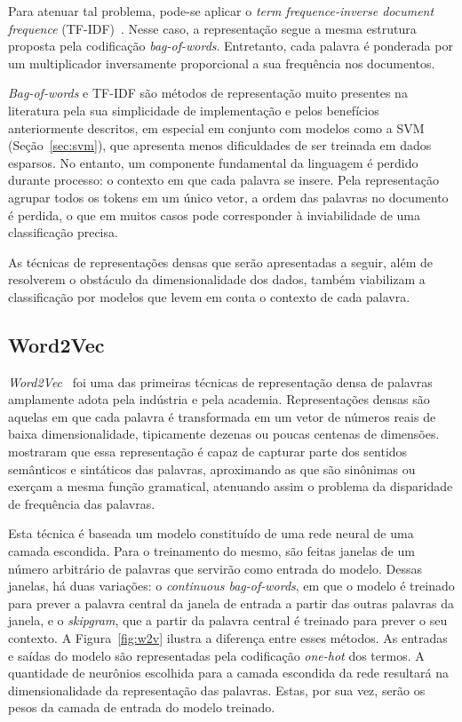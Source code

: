 Para atenuar tal problema, pode-se aplicar o \textit{term frequence-inverse
document frequence} (TF-IDF)~\cite{salton88}.
Nesse caso, a representação segue a mesma estrutura proposta pela codificação
\textit{bag-of-words}.
Entretanto, cada palavra é ponderada por um multiplicador inversamente
proporcional a sua frequência nos documentos.


\textit{Bag-of-words} e TF-IDF são métodos de representação muito presentes na
literatura pela sua simplicidade de implementação e pelos benefícios
anteriormente descritos, em especial em conjunto com modelos como a
SVM (Seção~\ref{sec:svm}), que apresenta menos dificuldades de ser treinada em
dados esparsos.
No entanto, um componente fundamental da linguagem é perdido durante processo: o
contexto em que cada palavra se insere.
Pela representação agrupar todos os tokens em um único vetor, a ordem das
palavras no documento é perdida, o que em muitos casos pode corresponder à
inviabilidade de uma classificação precisa.


As técnicas de representações densas que serão apresentadas a seguir, além de
resolverem o obstáculo da dimensionalidade dos dados, também viabilizam a
classificação por modelos que levem em conta o contexto de cada palavra.

\subsection{Word2Vec} \label{sec:w2v}

\textit{Word2Vec}~\cite{mikolov13} foi uma das primeiras técnicas de
representação densa de palavras amplamente adota pela indústria e pela academia.
Representações densas são aquelas em que cada palavra é transformada em um vetor
de números reais de baixa dimensionalidade, tipicamente dezenas ou poucas
centenas de dimensões.
\citet{mikolov13} mostraram que essa representação é capaz de capturar parte dos
sentidos semânticos e sintáticos das palavras, aproximando as que são sinônimas
ou exerçam a mesma função gramatical, atenuando assim o problema da disparidade
de frequência das palavras.

Esta técnica é baseada um modelo constituído de uma rede neural de uma camada escondida.
Para o treinamento do mesmo, são feitas janelas de um número arbitrário de
palavras que servirão como entrada do modelo.
Dessas janelas, há duas variações: o \textit{continuous bag-of-words}, em que
o modelo é treinado para prever a palavra central da janela de entrada a partir
das outras palavras da janela, e o \textit{skipgram}, que a partir da palavra
central é treinado para prever o seu contexto.
A Figura~\ref{fig:w2v} ilustra a diferença entre esses métodos.
As entradas e saídas do modelo são representadas pela codificação
\textit{one-hot} dos termos.
A quantidade de neurônios escolhida para a camada escondida da rede resultará na
dimensionalidade da representação das palavras.
Estas, por sua vez, serão os pesos da camada de entrada do modelo treinado.

